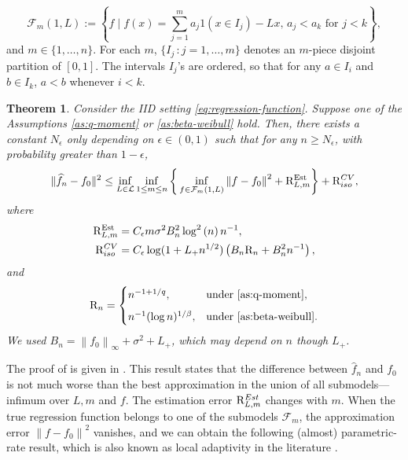 \documentclass[12pt]{article}
\newtheorem{theorem}{Theorem}[section]
\begin{document}
\begin{equation}\label{eq:adaptive-class}
	\mathcal{F}_{m}(1,L) := \left\{f\mid f(x) = \sum_{j=1}^m a_j1(x\in I_j)-Lx,\, a_j < a_k \text { for } j<k\right\},
\end{equation}
and $m \in \{1,\ldots,n\}$. For each $m$, $\{I_j\,: j = 1,\ldots,m\}$ denotes an $m$-piece disjoint partition of $[0,1]$. The intervals $I_j$'s are ordered, so that for any $a\in I_i$ and $b\in I_k$, $a<b$ whenever $i<k$.

\begin{theorem}\label{th: general_isotonic}
Consider the IID setting \eqref{eq:regression-function}.
Suppose one of the Assumptions \ref{as:q-moment} or \ref{as:beta-weibull} hold. Then, there exists a constant $N_\epsilon$ only depending on $\epsilon\in(0,1)$ such that for any $n \ge N_\epsilon$, with probability greater than $1-\epsilon$,
\begin{equation*}
\begin{aligned}
\|\widehat{f}_n-f_0\|^2  \leq \inf _{L \in \mathcal{L}}\inf _{1 \leq m \leq n}\left\{ \, \inf _{f \in \mathcal{F}_m(1, L)}\left\|f-f_0\right\|^2+ 
\mathrm{R}_{L,m}^{\mathrm{Est}}\right\} +\mathrm{R}^{\rm CV}_{\rm iso},
\end{aligned}
\end{equation*}
where
\begin{equation*}
    \begin{aligned}
\mathrm{R}_{L,m}^{\mathrm{Est}}& =C_\epsilon m \sigma^2 B_n^2 \log ^2\left(n \right)n^{-1},\\
        \mathrm{R}^{\rm CV}_{\rm iso}
 & =  C_\epsilon \log (1+ L_{+} n^{1 / 2})\left( B_n\mathrm{R}_n + B_n^2n^{-1} \right), 
 \end{aligned}
 \end{equation*}
 and
\begin{equation*}
\mathrm{R}_n =
\begin{cases}
   n^{-1+1/q}, & \text{under } \Cref{as:q-moment}, \\[6pt]
   n^{-1} (\log n)^{1/\beta}, & \text{under } \Cref{as:beta-weibull}.
\end{cases}
\end{equation*}
We used $B_n=\left\|f_0\right\|_{\infty}+\sigma^2+L_{+}$, which may depend on $n$ though $L_+$.
\end{theorem}

The proof of  is given in . This result states that the difference between $\widehat f_n$ and $f_0$ is not much worse than the best approximation in the union of all submodels---infimum over $L,m$ and $f$. The estimation error $\mathrm{R}_{L,m}^{\rm Est}$ changes with $m$. When the true regression function belongs to one of the submodels $\mathcal{F}_{m}$, the approximation error $\left\|f-f_0\right\|^2$ vanishes, and we can obtain the following (almost) parametric-rate result, which is also known as local adaptivity in the literature \citep{guntuboyina2018nonparametric}.
\end{document}

